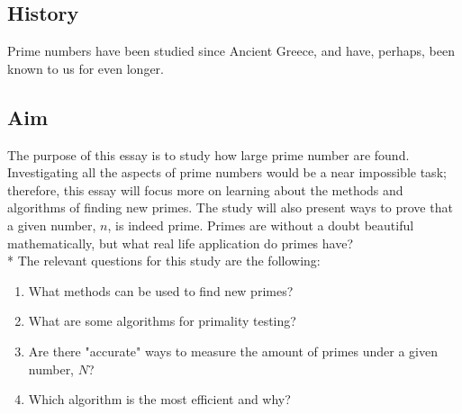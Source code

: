 \documentclass[main.tex]{subfiles}
\begin{document}
\subsection{History}
Prime numbers have been studied since Ancient Greece, and have, perhaps, been known to us for even longer. \cite{prime}

\subsection{Aim}
The purpose of this essay is to study how large prime number are found. Investigating all the aspects of prime numbers would be a near impossible task; therefore, this essay will focus more on learning about the methods and algorithms of finding new primes. The study will also present ways to prove that a given number, $n$, is indeed prime. Primes are without a doubt beautiful mathematically, but what real life application do primes have?
\newline
\\*
The relevant questions for this study are the following:
\begin{enumerate}
    \item What methods can be used to find new primes?
    \item What are some algorithms for primality testing?
    \item Are there "accurate" ways to measure the amount of primes under a given number, $N$?
    \item Which algorithm is the most efficient and why?
\end{enumerate}
\end{document}
